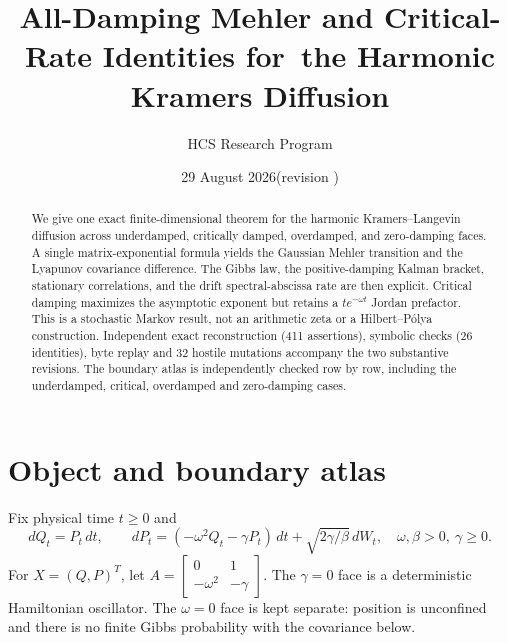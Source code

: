 \documentclass[10pt]{article}
\title{All-Damping Mehler and Critical-Rate Identities for\ the Harmonic Kramers Diffusion}
\author{HCS Research Program}
\date{29 August 2026\quad (revision \CRevisionRound)}
\begin{document}
\maketitle

\begin{abstract}
We give one exact finite-dimensional theorem for the harmonic Kramers--Langevin
diffusion across underdamped, critically damped, overdamped, and zero-damping
faces.  A single matrix-exponential formula yields the Gaussian Mehler
transition and the Lyapunov covariance difference.  The Gibbs law, the
positive-damping Kalman bracket, stationary correlations, and the
drift spectral-abscissa rate are then explicit.  Critical damping maximizes
the asymptotic exponent but retains a $t e^{-\omega t}$ Jordan prefactor.
This is a stochastic Markov result, not an arithmetic zeta or a
Hilbert--P\'olya construction.  Independent exact reconstruction (411
assertions), symbolic checks (26 identities), byte replay and 32 hostile
mutations accompany the two substantive revisions.  The boundary atlas is
independently checked row by row, including the underdamped, critical,
overdamped and zero-damping cases.
\end{abstract}

\section{Object and boundary atlas}
Fix physical time $t\geq0$ and
\begin{equation}
dQ_t=P_t\,dt,\qquad
dP_t=(-\omega^2Q_t-\gamma P_t)\,dt+\sqrt{2\gamma/\beta}\,dW_t,
\quad \omega,\beta>0,\ \gamma\geq0. \tag{1}
\end{equation}
For $X=(Q,P)^T$, let
$A=\left[\begin{smallmatrix}0&1\\-\omega^2&-\gamma\end{smallmatrix}\right]$.
The $\gamma=0$ face is a deterministic Hamiltonian oscillator.  The
$\omega=0$ face is kept separate: position is unconfined and there is no
finite Gibbs probability with the covariance below.
\end{document}
